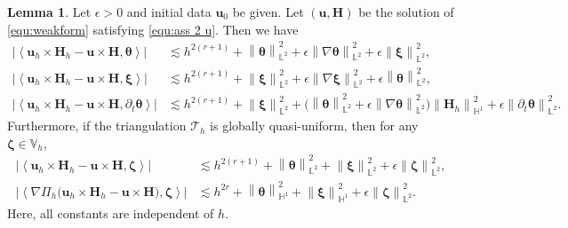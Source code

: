 \documentclass[11pt, reqno]{amsart}
\theoremstyle{definition}
\newtheorem{lemma}[theorem]{Lemma}
\theoremstyle{remark}
\numberwithin{equation}{section}
\newcommand{\bff}{\boldsymbol}
\newcommand{\bb}{\mathbb}
\newcommand{\norm}[2]{\left\|{#1}\right\|_{#2}}
\newcommand{\inpro}[2]{\left\langle#1,#2\right\rangle}
\begin{document}
\begin{lemma}\label{lem:cross est}
Let $\epsilon>0$ and initial data $\bff{u}_0$ be given. Let $(\bff{u},\bff{H})$ be the solution of \eqref{equ:weakform} satisfying \eqref{equ:ass 2 u}. Then we have
\begin{align}
	\label{equ:uh cross Hh theta}
	\big| \inpro{\bff{u}_h \times \bff{H}_h- \bff{u} \times \bff{H}}{\bff{\theta}} \big| 
	&\lesssim
	h^{2(r+1)} 
	+ 
	\norm{\bff{\theta}}{\bb{L}^2}^2 
	+ 
	\epsilon \norm{\nabla \bff{\theta}}{\bb{L}^2}^2
	+
	\epsilon \norm{\bff{\xi}}{\bb{L}^2}^2,
	\\
	\label{equ:uh cross Hh xi}
	\big| \inpro{\bff{u}_h \times \bff{H}_h- \bff{u} \times \bff{H}}{\bff{\xi}} \big| 
	&\lesssim
	h^{2(r+1)} 
	+ 
	\norm{\bff{\xi}}{\bb{L}^2}^2 
	+ 
	\epsilon \norm{\nabla \bff{\xi}}{\bb{L}^2}^2
	+
	\epsilon \norm{\bff{\theta}}{\bb{L}^2}^2,
	\\
	\label{equ:uh cross Hh dt theta}
	\big| \inpro{\bff{u}_h \times \bff{H}_h- \bff{u} \times \bff{H}}{\partial_t \bff{\theta}} \big| 
	&\lesssim
	h^{2(r+1)}
	+
	\norm{\bff{\xi}}{\bb{L}^2}^2
	+
	\big( \norm{\bff{\theta}}{\bb{L}^2}^2 + \epsilon \norm{\nabla \bff{\theta}}{\bb{L}^2}^2 \big) \norm{\bff{H}_h}{\bb{H}^1}^2
	+
	\epsilon \norm{\partial_t \bff{\theta}}{\bb{L}^2}^2.
\end{align}
Furthermore, if the triangulation $\mathcal{T}_h$ is globally quasi-uniform, then for any $\bff{\zeta}\in \bb{V}_h$,
\begin{align}
	\label{equ:uh cross Hh Delta}
	\big| \inpro{\bff{u}_h \times \bff{H}_h- \bff{u} \times \bff{H}}{\bff{\zeta}} \big| 
	&\lesssim
	h^{2(r+1)} 
	+ 
	\norm{\bff{\theta}}{\bb{L}^2}^2 
	+
	\norm{\bff{\xi}}{\bb{L}^2}^2
	+ 
	\epsilon \norm{\bff{\zeta}}{\bb{L}^2}^2,
	\\
	\label{equ:nab uh cross Hh}
	\big|\inpro{\nabla\Pi_h\big(\bff{u}_h \times \bff{H}_h- \bff{u} \times \bff{H}\big)}{\bff{\zeta}} \big|
	&\lesssim
	h^{2r}
	+
	\norm{\bff{\theta}}{\bb{H}^1}^2
	+
	\norm{\bff{\xi}}{\bb{H}^1}^2
	+
	\epsilon \norm{\bff{\zeta}}{\bb{L}^2}^2.
\end{align}
Here, all constants are independent of $h$.
\end{lemma}
\end{document}
